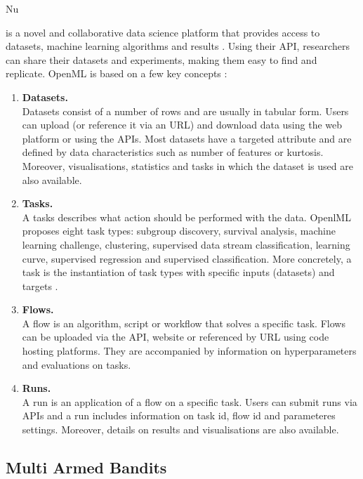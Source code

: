 Nu\documentclass[11pt,twoside, a4paper]{report}
\begin{document}
 is a novel and collaborative data science platform that provides access to datasets, machine learning algorithms and results \parencite{VanRijn2013}. Using their API, researchers can share their datasets and experiments, making them easy to find and replicate. OpenML is based on a few key concepts \parencite{openml}:
\begin{enumerate}
    \item \textbf{Datasets.} \\
    Datasets consist of a number of rows and are usually in tabular form. Users can upload (or reference it via an URL) and download data using the web platform or using the APIs. Most datasets have a targeted attribute and are defined by data characteristics such as number of features or kurtosis. Moreover, visualisations, statistics and tasks in which the dataset is used are also available.
    \item \textbf{Tasks.} \\
    A tasks describes what action should be performed with the data. OpenlML proposes eight task types: subgroup discovery, survival analysis, machine learning challenge, clustering, supervised data stream classification, learning curve, supervised regression and supervised classification. More concretely, a task is the instantiation of task types with specific inputs (datasets) and targets \parencite{Vanschoren2014}.
    \item \textbf{Flows.} \\
    A flow is an algorithm, script or workflow that solves a specific task. Flows can be uploaded via the API, website or referenced by URL using code hosting platforms. They are accompanied by information on hyperparameters and evaluations on tasks.
    \item \textbf{Runs.} \\
    A run is an application of a flow on a specific task. Users can submit runs via APIs and a run includes information on task id, flow id and parameteres settings. Moreover, details on results and visualisations are also available. 
\end{enumerate}

\subsection{Multi Armed Bandits}
\end{document}
